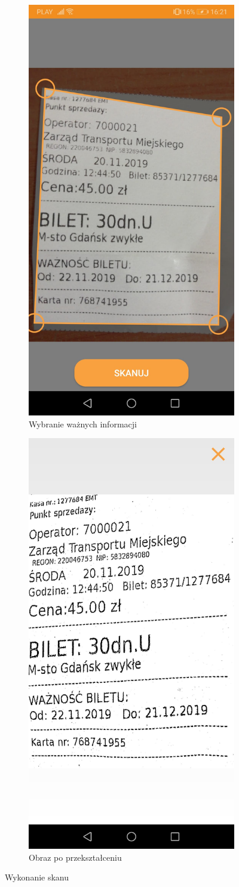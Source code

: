 \documentclass[10pt,twoside,a4paper]{report}
\begin{document}
\begin{figure}[h]
\begin{subfigure}{0.5\textwidth}
\includegraphics[width=0.9\linewidth, width=5cm]{chooseScan}
\caption{Wybranie ważnych informacji}
\label{fig:chooseScan}
\end{subfigure}
\begin{subfigure}{0.5\textwidth}
\centering
\includegraphics[width=0.9\linewidth, width=5cm]{scan}
\caption{Obraz po przekształceniu}
\label{fig:scan}
\end{subfigure}
\caption{Wykonanie skanu}
\label{fig:podrecznik8}
\end{figure}
\FloatBarrier
\end{document}
